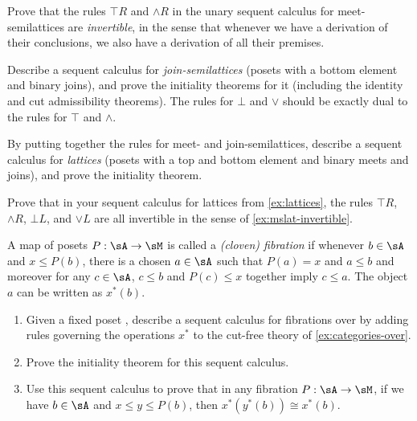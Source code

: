 \documentclass{book}
\let\meet\wedge
\def\meetR{\mathord{\meet}R}
\let\join\vee
\begin{document}
\begin{ex}\label{ex:mslat-invertible}
  Prove that the rules $\top R$ and $\meetR$ in the unary sequent calculus for meet-semilattices are \emph{invertible}, in the sense that whenever we have a derivation of their conclusions, we also have a derivation of all their premises.
\end{ex}

\begin{ex}\label{ex:jslat}
  Describe a sequent calculus for \emph{join-semilattices} (posets with a bottom element and binary joins), and prove the initiality theorems for it (including the identity and cut admissibility theorems).
  The rules for $\bot$ and $\join$ should be exactly dual to the rules for $\top$ and $\meet$.
\end{ex}

\begin{ex}\label{ex:lattices}
  By putting together the rules for meet- and join-semilattices, describe a sequent calculus for \emph{lattices} (posets with a top and bottom element and binary meets and joins), and prove the initiality theorem.
\end{ex}

\begin{ex}\label{ex:lattices-invertible}
  Prove that in your sequent calculus for lattices from \cref{ex:lattices}, the rules $\top R$, $\meet R$, $\bot L$, and $\join L$ are all invertible in the sense of \cref{ex:mslat-invertible}.
\end{ex}

\begin{ex}\label{ex:seqcalc-poset-fib}
  A map of posets $P:\sA\to\sM$ is called a \emph{(cloven) fibration} if whenever $b\in\sA$ and $x\le P(b)$, there is a chosen $a\in \sA$ such that $P(a)=x$ and $a\le b$ and moreover for any $c\in\sA$, $c\le b$ and $P(c)\le x$ together imply $c\le a$.
  The object $a$ can be written as $x^*(b)$.
  \begin{enumerate}
  \item Given a fixed poset \sM, describe a sequent calculus for fibrations over \sM by adding rules governing the operations $x^*$ to the cut-free theory of \cref{ex:categories-over}.
  \item Prove the initiality theorem for this sequent calculus.
  \item Use this sequent calculus to prove that in any fibration $P:\sA\to\sM$, if we have $b\in \sA$ and $x\le y\le P(b)$, then $x^*(y^*(b))\cong x^*(b)$.
  \end{enumerate}
\end{ex}
\end{document}
